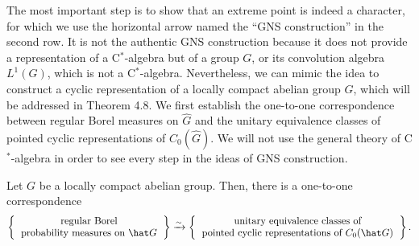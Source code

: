 \documentclass[a4paper]{article}
\begin{document}
The most important step is to show that an extreme point is indeed a character, for which we use the horizontal arrow named the ``GNS construction'' in the second row.
It is not the authentic GNS construction because it does not provide a representation of a C$^*$-algebra but of a group $G$, or its convolution algebra $L^1(G)$, which is not a C$^*$-algebra.
Nevertheless, we can mimic the idea to construct a cyclic representation of a locally compact abelian group $G$, which will be addressed in Theorem 4.8.
We first establish the one-to-one correspondence between regular Borel measures on $\hat G$ and the unitary equivalence classes of pointed cyclic representations of $C_0(\hat G)$.
We will not use the general theory of C$^*$-algebra in order to see every step in the ideas of GNS construction.

\begin{thm}
Let $G$ be a locally compact abelian group.
Then, there is a one-to-one correspondence
\[\left\{\begin{tabular}{c}regular Borel\\probability measures on $\hat G$\end{tabular}\right\}\xrightarrow{\sim}\left\{\begin{tabular}{c}unitary equivalence classes of\\pointed cyclic representations of $C_0(\hat G)$\end{tabular}\right\}.\]
\end{thm}
\end{document}
